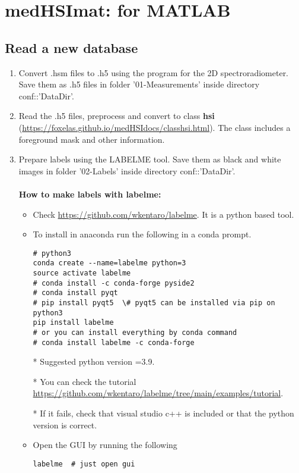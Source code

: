 \documentclass{foxelas_report}
\begin{document}
\section{medHSImat: for MATLAB}

\subsection{Read a new database}
\begin{enumerate}
\item Convert .hsm files to .h5 using the program for the 2D spectroradiometer. Save them as .h5 files in folder '01-Measurements' inside directory conf::'DataDir'. 

\item Read the .h5 files, preprocess and convert to class \textbf{hsi} (\url{https://foxelas.github.io/medHSIdocs/classhsi.html}). The class includes a foreground mask and other information. 

\item Prepare labels using the LABELME tool. Save them as black and white images in folder '02-Labels' inside directory conf::'DataDir'. \\
\\
\textbf{How to make labels with labelme: 
}\begin{itemize}
\item Check  \url{https://github.com/wkentaro/labelme}. It is a python based tool.

\item To install in anaconda run the following in a conda prompt.\\

\begin{lstlisting}
# python3
conda create --name=labelme python=3
source activate labelme
# conda install -c conda-forge pyside2
# conda install pyqt
# pip install pyqt5  \# pyqt5 can be installed via pip on python3
pip install labelme
# or you can install everything by conda command
# conda install labelme -c conda-forge
\end{lstlisting}



* Suggested python version =3.9. 

* You can check the tutorial \url{https://github.com/wkentaro/labelme/tree/main/examples/tutorial}.

* If it fails, check that visual studio c++ is included or that the python version is correct. 


\item Open the GUI by running the following \\
\begin{lstlisting}
labelme  # just open gui
\end{lstlisting}


\end{itemize}
\end{enumerate}
\end{document}
